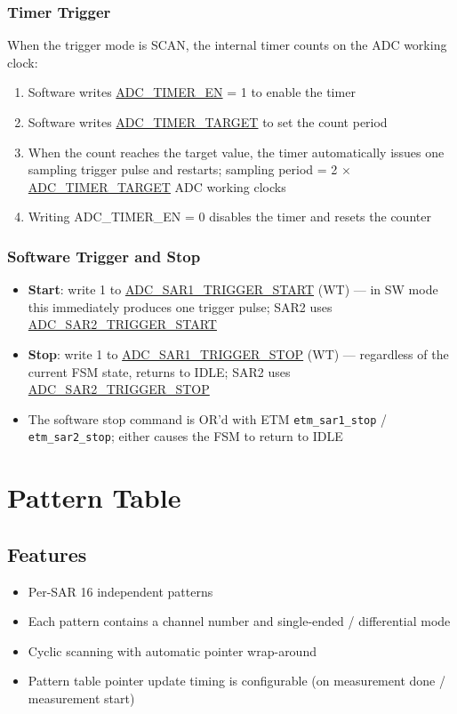 \documentclass[main\_\_EN.tex]{subfiles}
\begin{document}
\subsubsection{Timer Trigger}
When the trigger mode is SCAN, the internal timer counts on the ADC working clock:
\begin{enumerate}
    \item Software writes \hyperref[fielddesc:ADCTIMEREN]{ADC\_TIMER\_EN} = 1 to enable the timer
    \item Software writes \hyperref[fielddesc:ADCTIMERTARGET]{ADC\_TIMER\_TARGET} to set the count period
    \item When the count reaches the target value, the timer automatically issues one sampling trigger pulse and restarts; sampling period = 2 $\times$ \hyperref[fielddesc:ADCTIMERTARGET]{ADC\_TIMER\_TARGET} ADC working clocks
    \item Writing ADC\_TIMER\_EN = 0 disables the timer and resets the counter
\end{enumerate}

\subsubsection{Software Trigger and Stop}
\begin{itemize}
    \item \textbf{Start}: write 1 to \hyperref[fielddesc:ADCSAR1TRIGGERSTART]{ADC\_SAR1\_TRIGGER\_START} (WT) --- in SW mode this immediately produces one trigger pulse; SAR2 uses \hyperref[fielddesc:ADCSAR2TRIGGERSTART]{ADC\_SAR2\_TRIGGER\_START}
    \item \textbf{Stop}: write 1 to \hyperref[fielddesc:ADCSAR1TRIGGERSTOP]{ADC\_SAR1\_TRIGGER\_STOP} (WT) --- regardless of the current FSM state, returns to IDLE; SAR2 uses \hyperref[fielddesc:ADCSAR2TRIGGERSTOP]{ADC\_SAR2\_TRIGGER\_STOP}
    \item The software stop command is OR'd with ETM \verb+etm_sar1_stop+ / \verb+etm_sar2_stop+; either causes the FSM to return to IDLE
\end{itemize}


\section{Pattern Table}
\label{sec:adc-pattern}

\subsection{Features}
\begin{itemize}
    \item Per-SAR 16 independent patterns
    \item Each pattern contains a channel number and single-ended / differential mode
    \item Cyclic scanning with automatic pointer wrap-around
    \item Pattern table pointer update timing is configurable (on measurement done / measurement start)
\end{itemize}
\end{document}
